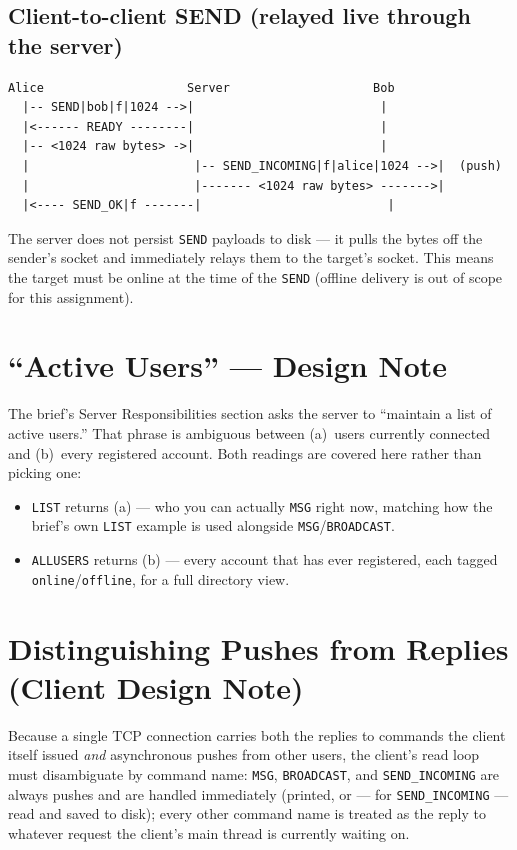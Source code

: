 \documentclass[11pt]{article}
\newcommand{\cmd}[1]{\texttt{#1}}
\begin{document}
\subsection{Client-to-client SEND (relayed live through the server)}
\begin{verbatim}
Alice                    Server                    Bob
  |-- SEND|bob|f|1024 -->|                          |
  |<------ READY --------|                          |
  |-- <1024 raw bytes> ->|                          |
  |                       |-- SEND_INCOMING|f|alice|1024 -->|  (push)
  |                       |------- <1024 raw bytes> ------->|
  |<---- SEND_OK|f -------|                          |
\end{verbatim}

The server does not persist \cmd{SEND} payloads to disk --- it pulls the
bytes off the sender's socket and immediately relays them to the
target's socket. This means the target must be online at the time of
the \cmd{SEND} (offline delivery is out of scope for this assignment).

\section{``Active Users'' --- Design Note}

The brief's Server Responsibilities section asks the server to
``maintain a list of active users.'' That phrase is ambiguous between
(a)~users currently connected and (b)~every registered account. Both
readings are covered here rather than picking one:

\begin{itemize}[leftmargin=1.5em]
  \item \cmd{LIST} returns (a) --- who you can actually \cmd{MSG} right
        now, matching how the brief's own \cmd{LIST} example is used
        alongside \cmd{MSG}/\cmd{BROADCAST}.
  \item \cmd{ALLUSERS} returns (b) --- every account that has ever
        registered, each tagged \cmd{online}/\cmd{offline}, for a full
        directory view.
\end{itemize}

\section{Distinguishing Pushes from Replies (Client Design Note)}

Because a single TCP connection carries both the replies to commands the
client itself issued \textit{and} asynchronous pushes from other users,
the client's read loop must disambiguate by command name: \cmd{MSG},
\cmd{BROADCAST}, and \cmd{SEND\_INCOMING} are always pushes and are
handled immediately (printed, or --- for \cmd{SEND\_INCOMING} --- read
and saved to disk); every other command name is treated as the reply to
whatever request the client's main thread is currently waiting on.
\end{document}
